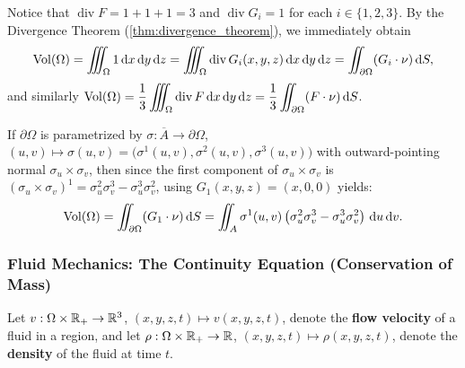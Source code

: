 \begin{demonstration}
Notice that $\operatorname{div} F = 1 + 1 + 1 = 3$ and $\operatorname{div} G_i = 1$ for each $i \in \{1, 2, 3\}$. By the Divergence Theorem (\ref{thm:divergence_theorem}), we immediately obtain
\[
    \operatorname{Vol}(\Omega) = \iiint_{\Omega} 1 \,\mathrm{d}x\,\mathrm{d}y\,\mathrm{d}z = \iiint_{\Omega} \operatorname{div} G_i(x,y,z) \,\mathrm{d}x\,\mathrm{d}y\,\mathrm{d}z = \iint_{\partial\Omega} (G_i \cdot \nu) \,\mathrm{d}S,
\]
and similarly $\displaystyle\operatorname{Vol}(\Omega) = \frac{1}{3} \iiint_{\Omega} \operatorname{div} F \,\mathrm{d}x\,\mathrm{d}y\,\mathrm{d}z = \frac{1}{3} \iint_{\partial\Omega} (F \cdot \nu) \,\mathrm{d}S$.
\end{demonstration}

\begin{remarque}
If $\partial\Omega$ is parametrized by $\sigma : \overline{A} \to \partial\Omega$, $(u,v) \mapsto \sigma(u,v) = \big(\sigma^1(u,v), \sigma^2(u,v), \sigma^3(u,v)\big)$ with outward-pointing normal $\sigma_u \times \sigma_v$, then since the first component of $\sigma_u \times \sigma_v$ is $(\sigma_u \times \sigma_v)^1 = \sigma^2_u \sigma^3_v - \sigma^3_u \sigma^2_v$, using $G_1(x,y,z) = (x,0,0)$ yields:
\[
    \operatorname{Vol}(\Omega) = \iint_{\partial\Omega} (G_1 \cdot \nu) \,\mathrm{d}S = \iint_{A} \sigma^1(u,v) \left( \sigma^2_u \sigma^3_v - \sigma^3_u \sigma^2_v \right) \,\mathrm{d} u\,\mathrm{d} v.
\]
\end{remarque}

\subsubsection{Fluid Mechanics: The Continuity Equation (Conservation of Mass)}

Let $v : \Omega \times \mathbb{R}_+ \to \mathbb{R}^3$, $(x,y,z,t) \mapsto v(x,y,z,t)$, denote the \textbf{flow velocity} of a fluid in a region, and let $\rho : \Omega \times \mathbb{R}_+ \to \mathbb{R}$, $(x,y,z,t) \mapsto \rho(x,y,z,t)$, denote the \textbf{density} of the fluid at time $t$.

